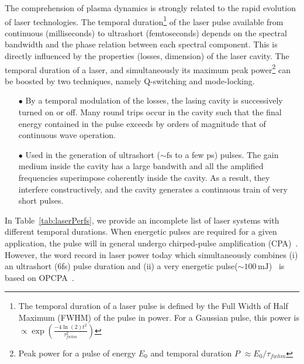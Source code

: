 The comprehension of plasma dynamics is strongly related to the rapid evolution of  laser technologies. The temporal duration\footnote{The temporal duration of a laser pulse is defined by the Full Width of Half Maximum (FWHM) of the pulse in power. For a Gaussian pulse, this power is $\propto \exp(\frac{-4 \ln (2)t^2}{\tau_{fwhm}^2})$} of the laser pulse available from continuous (milliseconds) to ultrashort (femtoseconds) depends on the spectral bandwidth and the phase relation between each spectral component. This is  directly influenced by the properties (losses, dimension) of the laser cavity. The temporal duration of a laser, and simultaneously its maximum  peak power\footnote{Peak power for a pulse of energy $E_0$ and temporal duration $P$ $\approx E_0/\tau_{fwhm}$} can be boosted by two techniques, namely Q-switching and mode-locking.\\

\begin{itemize}
\item[$\bullet$] By a temporal modulation of the losses, the lasing cavity is successively turned on or off. Many round trips occur in the cavity such that the final energy contained in the pulse exceeds by orders of magnitude that of continuous wave operation.\\
\item[$\bullet$] Used in the generation of ultrashort ($\sim \mathrm{fs}$ to a few ps) pulses. The gain medium inside the cavity has a large bandwith and all the amplified frequencies superimpose coherently inside the cavity. As a result, they interfere constructively, and the cavity generates a continuous train of very short pulses.
\end{itemize}

\vspace{0.3in}

\noindent In Table~\ref{tab:laserPerfs}, we provide an incomplete list of laser systems with different temporal durations. When energetic pulses are required for a given application, the pulse will in general undergo chirped-pulse amplification (CPA)~\cite{maine1988generation}. However, the word record in laser power today which simultaneously combines (i) an ultrashort (6fs) pulse duration and (ii) a very energetic pulse($\sim 100\,\mathrm{mJ}$)~\cite{mikhailova2011ultra} is based on OPCPA~\cite{dubietis1992powerful}.\\

